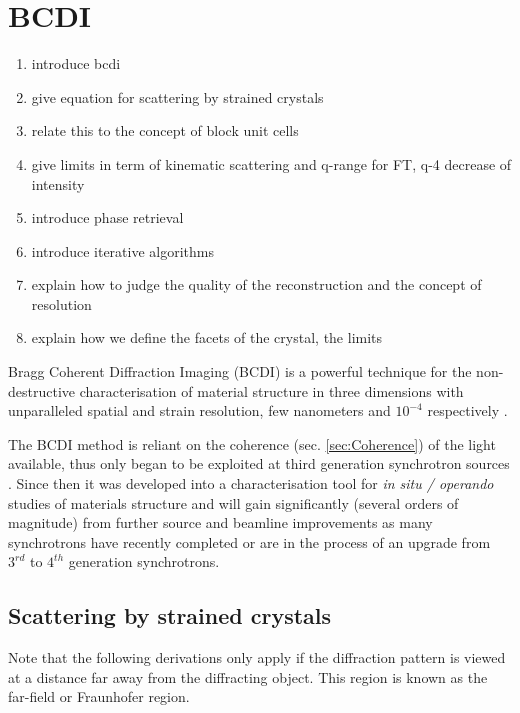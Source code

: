 \newpage
\section{BCDI} \label{sec:BCDI}

\begin{enumerate}
    \item introduce bcdi
    \item give equation for scattering by strained crystals
    \item relate this to the concept of block unit cells
    \item give limits in term of kinematic scattering and q-range for FT, q-4 decrease of intensity
    \item introduce phase retrieval
    \item introduce iterative algorithms
    \item explain how to judge the quality of the reconstruction and the concept of resolution
    \item explain how we define the facets of the crystal, the limits
\end{enumerate}

Bragg Coherent Diffraction Imaging (BCDI) \parencite{robinson_coherent_2009} is a powerful technique for the non-destructive characterisation of material structure in three dimensions with unparalleled spatial and strain resolution, few nanometers \parencite{labat_inversion_2015,cherukara_anisotropic_2018} and $10^{-4 }$ respectively \parencite{Newton2010,Lauraux2020}.

The BCDI method is reliant on the coherence (sec. \ref{sec:Coherence}) of the light available, thus only began to be exploited at third generation synchrotron sources \parencite{Miao1999,Miao2000,Robinson2001}.
Since then it was developed into a characterisation tool for \textit{in situ / operando} studies of materials structure \parencite{ulvestad_situ_2016,Kim2019,Carnis2021} and will gain significantly (several orders of magnitude) from further source and beamline improvements as many synchrotrons have recently completed or are in the process of an upgrade from $3^{rd}$ to $4^{th}$ generation synchrotrons.

\subsection{Scattering by strained crystals}

Note that the following derivations only apply if the diffraction pattern is viewed at a distance far away from the diffracting object. This region is known as the far-field or Fraunhofer region.

